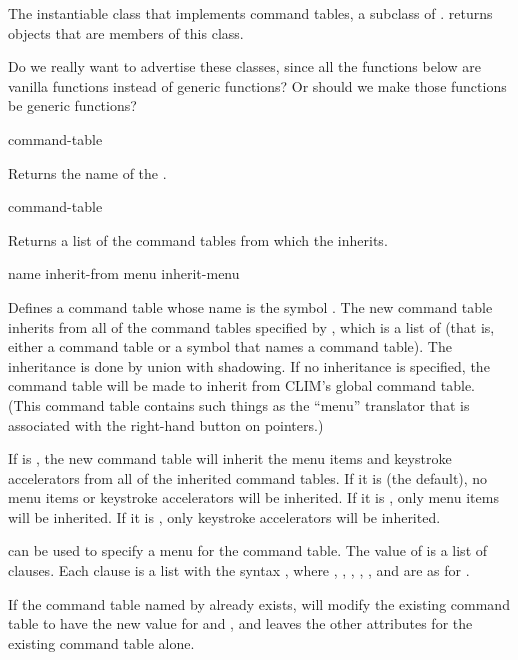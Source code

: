 
The instantiable class that implements command tables, a subclass of
.   returns objects that are members of
this class.

 {Do we really want to advertise these classes, since all the
functions below are vanilla functions instead of generic functions?  Or should
we make those functions be generic functions?}


 {command-table}

Returns the name of the  .

 {command-table}

Returns a list of the command tables from which the 
 inherits.
\ReadOnly


 {name \key inherit-from menu inherit-menu}

Defines a command table whose name is the symbol .  The new command
table inherits from all of the command tables specified by ,
which is a list of  (that is, either a command
table or a symbol that names a command table).  The inheritance is done by union
with shadowing.  If no inheritance is specified, the command table will be made
to inherit from CLIM's global command table.  (This command table contains such
things as the ``menu'' translator that is associated with the right-hand button
on pointers.)

If  is , the new command table will inherit the menu
items and keystroke accelerators from all of the inherited command tables.  If
it is  (the default), no menu items or keystroke accelerators will
be inherited. If it is , only menu items will be inherited. If it is
, only keystroke accelerators will be inherited.

 can be used to specify a menu for the command table.  The value of
 is a list of clauses.  Each clause is a list with the syntax
, where , ,
, , , and  are as
for .

If the command table named by  already exists,
 will modify the existing command table to have the new
value for  and , and leaves the other attributes for
the existing command table alone.

